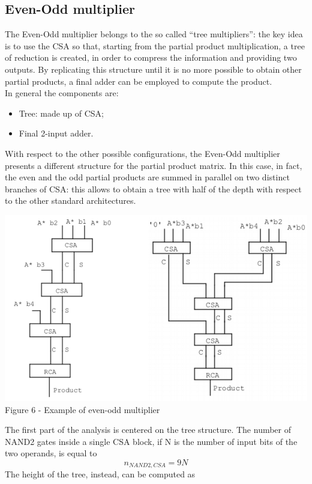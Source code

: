 \documentclass[11pt]{article} %
\begin{document}
\subsection{Even-Odd multiplier}
The Even-Odd multiplier belongs to the so called “tree multipliers”: the key idea is to use the CSA so that, starting from the partial product multiplication, a tree of reduction is created, in order to compress the information and providing two outputs. By replicating this structure until it is no more possible to obtain other partial products, a final adder can be employed to compute the product.\\
In general the components are: 
\begin{itemize}
\item Tree: made up of CSA;
\item Final 2-input adder.
\end{itemize}
With respect to the other possible configurations, the Even-Odd multiplier presents a different structure for the partial product matrix. In this case, in fact, the even and the odd partial products are summed in parallel on two distinct branches of CSA: this allows to obtain a tree with half of the depth with respect to the other standard architectures.
\vspace{1em}
\begin{center}
\includegraphics[scale=.40]{evenodd.PNG}\\
\small{Figure 6 - Example of even-odd multiplier}\\
\end{center}
The first part of the analysis is centered on the tree structure. The number of NAND2 gates inside a single CSA block, if N is the number of input bits of the two operands, is equal to
$$ n_{NAND2,CSA} = 9N $$
The height of the tree, instead, can be computed as
\end{document}
